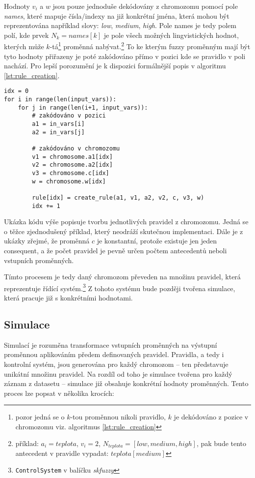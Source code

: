 \documentclass{article}
\begin{document}
Hodnoty $v_i$ a $w$ jsou pouze jednoduše dekódovány z chromozomu pomocí pole \emph{names}, které mapuje čísla/indexy na již konkrétní jména, která mohou být reprezentována například slovy: \emph{low}, \emph{medium}, \emph{high}. Pole names je tedy polem polí, kde prvek $N_k = names[k]$ je pole všech možných lingvistických hodnot, kterých může $k$-tá\footnote{pozor jedná se o $k$-tou proměnnou nikoli pravidlo, $k$ je dekódováno z pozice v chromozomu viz. algoritmus \ref{lst:rule_creation}} proměnná nabývat.\footnote{příklad: $a_i = teplota$, $v_i = 2$, $N_{teplota} = [low, medium, high]$, pak bude tento antecedent v pravidle vypadat: $teplota[medium]$} To ke kterým fuzzy proměnným mají být tyto hodnoty přiřazeny je poté zakódováno přímo v pozici kde se pravidlo v poli nachází. Pro lepší porozumění je k dispozici formálnější popis v algoritmu \ref{lst:rule_creation}.

\begin{listing}[H]
\begin{verbatim}
idx = 0
for i in range(len(input_vars)):
    for j in range(len(i+1, input_vars)):
        # zakódováno v pozici
        a1 = in_vars[i]
        a2 = in_vars[j]

        # zakódováno v chromozomu
        v1 = chromosome.a1[idx]
        v2 = chromosome.a2[idx]
        v3 = chromosome.c[idx]
        w = chromosome.w[idx]

        rule[idx] = create_rule(a1, v1, a2, v2, c, v3, w)
        idx += 1
\end{verbatim}
\caption{Ukázka kódu výše popisuje tvorbu jednotlivých pravidel z chromozomu. Jedná se o těžce zjednodušený příklad, který neodráží skutečnou implementaci. Dále je z ukázky zřejmé, že proměnná $c$ je konstantní, protože existuje jen jeden consequent, a že počet pravidel je pevně určen počtem antecedentů neboli vstupních proměnných.}
\label{lst:rule_creation}
\end{listing}

Tímto procesem je tedy daný chromozom převeden na množinu pravidel, která reprezentuje řídící systém.\footnote{\texttt{ControlSystem} v balíčku \emph{skfuzzy}} Z tohoto systému bude později tvořena simulace, která pracuje již s konkrétními hodnotami.

\subsection{Simulace}

Simulací je rozuměna transformace vstupních proměnných na výstupní proměnnou aplikováním předem definovaných pravidel. Pravidla, a tedy i kontrolní systém, jsou generována pro každý chromozom -- ten představuje unikátní množinu pravidel. Na rozdíl od toho je simulace tvořena pro každý záznam z datasetu -- simulace již obsahuje konkrétní hodnoty proměnných. Tento proces lze popsat v několika krocích:
\end{document}
